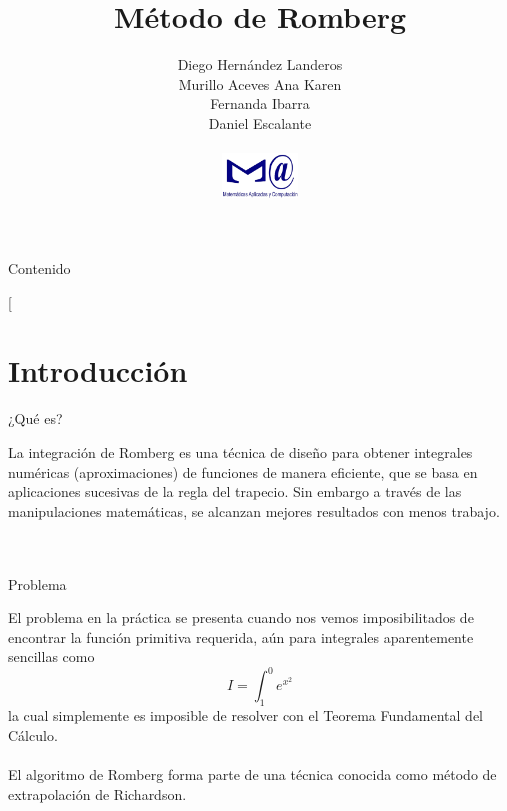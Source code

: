 \documentclass[spanish]{beamer}
\date{}
\makeatletter
\newcommand\makebeamertitle{\frame{\maketitle}}%
\let\origtableofcontents=\tableofcontents
\def\tableofcontents{\@ifnextchar[{\origtableofcontents}{\gobbletableofcontents}}
\def\gobbletableofcontents#1{\origtableofcontents}
\makeatother
\begin{document}
\title[Métodos numéricos II]{Método de Romberg}


\author[MAC]{
Diego Hernández Landeros\\
Murillo Aceves Ana Karen\\
Fernanda Ibarra\\
Daniel Escalante\\
\begin{figure}[h]
\centering
\includegraphics[width=2cm]{mac.png}
\end{figure}
}



\makebeamertitle


\begin{frame}[plain]{Contenido}


\tableofcontents{}
\end{frame}



\section{Introducción}
\begin{frame}{¿Qué es?}


La integración de Romberg es una \alert{técnica} de diseño para obtener integrales numéricas \alert{(aproximaciones)} de funciones de manera eficiente, que se basa en aplicaciones sucesivas de \alert{la regla del trapecio}. Sin embargo a través de las manipulaciones matemáticas, se alcanzan mejores resultados con menos trabajo.\\
\\$\,$\\ %

\end{frame}

\begin{frame}{Problema}

El problema en la práctica se presenta cuando nos vemos imposibilitados de encontrar la
función primitiva requerida, aún para integrales aparentemente sencillas como\\
{\small \[I=\int_{1}^{0}e^{x^{2}}\]}
la cual simplemente es imposible de resolver con el Teorema Fundamental del Cálculo.
\\$\,$\\
El algoritmo de Romberg forma parte de una técnica conocida como método de extrapolación de
Richardson.
\end{frame}
\end{document}

